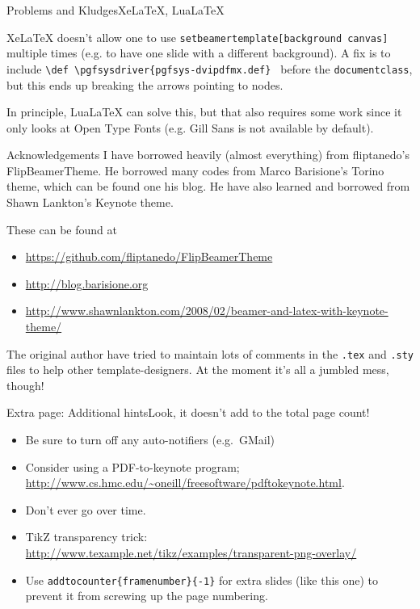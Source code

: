 \begin{frame}[c]{Problems and Kludges}{XeLaTeX, LuaLaTeX}

	XeLaTeX doesn't allow one to use \texttt{setbeamertemplate[background canvas]} multiple times (e.g. to have one slide with a different background). A fix is to include \texttt{\textbackslash def \textbackslash pgfsysdriver\{pgfsys-dvipdfmx.def\} } before the \texttt{documentclass}, but this ends up breaking the arrows pointing to nodes.

	In principle, LuaLaTeX can solve this, but that also requires some work since it only looks at Open Type Fonts (e.g. Gill Sans is not available by default).

\end{frame}



\begin{frame}[t]{Acknowledgements}
	I have borrowed heavily (almost everything) from fliptanedo's FlipBeamerTheme. He borrowed many codes from Marco Barisione's \alert{Torino theme}, which can be found one his blog. He have also learned and borrowed from Shawn Lankton's Keynote theme.

	\vspace{1em}
	These can be found at
	\begin{itemize}
		\item \url{https://github.com/fliptanedo/FlipBeamerTheme}
		\item \url{http://blog.barisione.org}
		\item \footnotesize{\url{http://www.shawnlankton.com/2008/02/beamer-and-latex-with-keynote-theme/}}
	\end{itemize}

	\vspace{1em}
	The original author have tried to maintain lots of comments in the \texttt{.tex} and \texttt{.sty} files to help other template-designers. At the moment it's all a jumbled mess, though!
\end{frame}



\addtocounter{framenumber}{-1}
\begin{frame}[c]{Extra page: Additional hints}{Look, it doesn't add to the total page count!}
	\begin{itemize}
		\item Be sure to turn off any auto-notifiers (e.g.\ GMail)
		\item Consider using a PDF-to-keynote program; \url{http://www.cs.hmc.edu/~oneill/freesoftware/pdftokeynote.html}.
		\item Don't ever go over time.
		\item TikZ transparency trick: \url{http://www.texample.net/tikz/examples/transparent-png-overlay/}
		\item Use \alert{\texttt{addtocounter\{framenumber\}\{-1\}}} for extra slides (like this one) to prevent it from screwing up the page numbering.
	\end{itemize}
\end{frame}